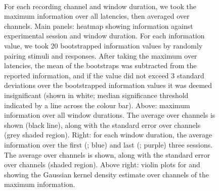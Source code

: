 \begin{figure}[htbp]%
    \centering
    \hspace*{\fill}
    \hspace*{\fill}\hspace{.2cm}\hspace*{\fill}
    \hspace*{\fill}
    \\
    \hspace*{\fill}
    \hspace*{\fill}\hspace{.2cm}\hspace*{\fill}
    \hspace*{\fill}
    \caption{
For each recording channel and window duration, we took the maximum information over all latencies, then averaged over channels.
Main panels: heatmap showing information against experimental session and window duration.
For each information value, we took \num{20} bootstrapped information values by randomly pairing stimuli and responses.
After taking the maximum over latencies, the mean of the bootstraps was subtracted from the reported information, and if the value did not exceed \num{3} standard deviations over the bootstrapped information values it was deemed insignificant (shown in white; median significance threshold indicated by a line across the colour bar).
Above: maximum information over all window durations.
The average over channels is shown (black line), along with the standard error over channels (grey shaded region).
Right: for each window duration, the average information over the first (; blue) and last (; purple) three sessions.
The average over channels is shown, along with the standard error over channels (shaded region).
Above right: violin plots for  and  showing the Gaussian kernel density estimate over channels of the maximum information.
    \label{fig:info_winlen}
}
\end{figure}

